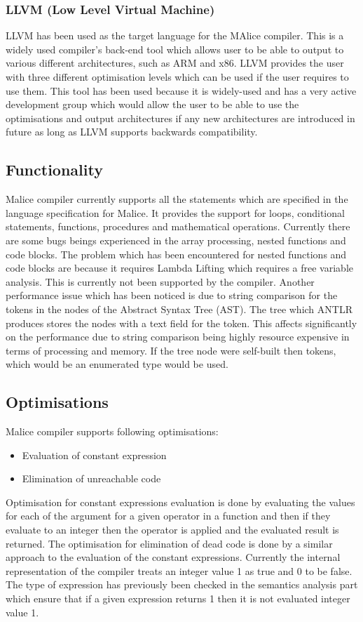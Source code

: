 \documentclass[a4wide, 11pt]{article}
\begin{document}
		\subsubsection{LLVM (Low Level Virtual Machine)}
			LLVM has been used as the target language for the MAlice compiler. This is a widely used compiler's back-end tool which
			allows user to be able to output to various different architectures, such as ARM and x86. LLVM provides the user
			with three different optimisation levels which can be used if the user requires to use them. This tool has been used because
			it is widely-used and has a very active development group which would allow the user to be able to use the optimisations and
			output architectures if any new architectures are introduced in future as long as LLVM supports backwards compatibility.
		
	\subsection{Functionality}			
		Malice compiler currently supports all the statements which are specified in the language specification for Malice. It provides
		the support for loops, conditional statements, functions, procedures and mathematical operations. Currently there are some bugs
		beings experienced in the array processing, nested functions and code blocks. The problem which has been encountered for 
		nested functions and code blocks are because it requires Lambda Lifting which requires a free variable analysis. This is currently
		not been supported by the compiler. Another performance issue which has been noticed is due to string comparison for the tokens in
		the nodes of the Abstract Syntax Tree (AST). The tree which ANTLR produces stores the nodes with a text field for the token.
		This affects significantly on the performance due to string comparison being highly resource expensive in terms of processing and memory.
		If the tree node were self-built then tokens, which would be an enumerated type would be used.
	
	\subsection{Optimisations}
		Malice compiler supports following optimisations:
		\begin{itemize}
			\item Evaluation of constant expression
			\item Elimination of unreachable code
		\end{itemize} 
		Optimisation for constant expressions evaluation is done by evaluating the values for each of the argument for a given operator in a function
		and then if they evaluate to an integer then the operator is applied and the evaluated result is returned. The optimisation
		for elimination of dead code is done by a similar approach to the evaluation of the constant expressions. Currently 
		the internal representation of the compiler treats an integer value 1 as true and 0 to be false. The type of expression has
		previously been checked in the semantics analysis part which ensure that if a given expression returns 1 then it is not 
		evaluated integer value 1.
	
\end{document}
